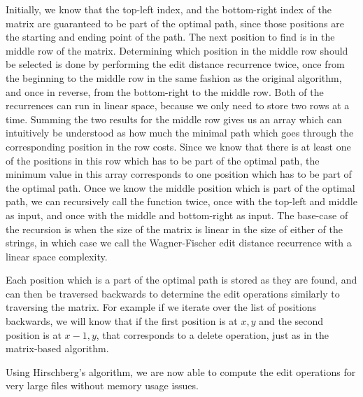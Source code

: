Initially, we know that the top-left index, and the bottom-right index of the matrix are
guaranteed to be part of the optimal path, since those positions are the starting and
ending point of the path. The next position to find is in the middle row of the matrix.
Determining which position in the middle row should be selected is done by performing the
edit distance recurrence twice, once from the beginning to the middle row in the same
fashion as the original algorithm, and once in reverse, from the bottom-right to the
middle row. Both of the recurrences can run in linear space, because we only need to store
two rows at a time. Summing the two results for the middle row gives us an array which can
intuitively be understood as how much the minimal path which goes through the
corresponding position in the row costs. Since we know that there is at least one of the
positions in this row which has to be part of the optimal path, the minimum value in this
array corresponds to one position which has to be part of the optimal path. Once we know
the middle position which is part of the optimal path, we can recursively call the
function twice, once with the top-left and middle as input, and once with the middle and
bottom-right as input. The base-case of the recursion is when the size of the matrix is
linear in the size of either of the strings, in which case we call the Wagner-Fischer
edit distance recurrence with a linear space complexity.

Each position which is a part of the optimal path is stored as they are found, and can
then be traversed backwards to determine the edit operations similarly to traversing the
matrix. For example if we iterate over the list of positions backwards, we will know that
if the first position is at $x, y$ and the second position is at $x - 1, y$, that
corresponds to a delete operation, just as in the matrix-based algorithm.

Using Hirschberg's algorithm, we are now able to compute the edit operations for very
large files without memory usage issues.

